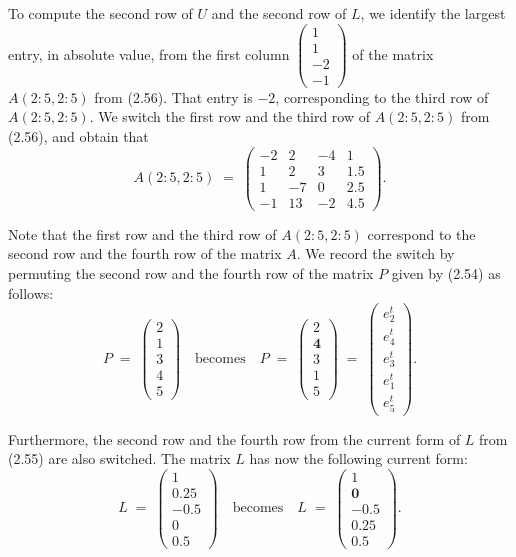 To compute the second row of $U$ and the second row of $L$, we identify the
largest entry, in absolute value, from the first column
$\begin{pmatrix} 1\\ 1\\ -2\\ -1 \end{pmatrix}$
of the matrix $A(2:5,2:5)$ from (2.56). That entry is $-2$, corresponding to
the third row of $A(2:5,2:5)$. We switch the first row and the third row of
$A(2:5,2:5)$ from (2.56), and obtain that
\begin{equation}
A(2:5,2:5) \;=\;
\begin{pmatrix} -2 & 2 & -4 & 1\\ 1 & 2 & 3 & 1.5\\ 1 & -7 & 0 & 2.5\\ -1 & 13 & -2 & 4.5 \end{pmatrix}.
\end{equation}

Note that the first row and the third row of $A(2:5,2:5)$ correspond to the
second row and the fourth row of the matrix $A$. We record the switch by
permuting the second row and the fourth row of the matrix $P$ given by
(2.54) as follows:
\begin{equation}
P \;=\; \begin{pmatrix} 2\\ 1\\ 3\\ 4\\ 5 \end{pmatrix}
\quad \text{becomes} \quad
P \;=\; \begin{pmatrix} 2\\ \mathbf{4}\\ 3\\ 1\\ 5 \end{pmatrix}
\;=\;
\begin{pmatrix} e_2^t\\ e_4^t\\ e_3^t\\ e_1^t\\ e_5^t \end{pmatrix}.
\end{equation}

Furthermore, the second row and the fourth row from the current form of $L$
from (2.55) are also switched. The matrix $L$ has now the following current
form:
\begin{equation}
L \;=\; \begin{pmatrix} 1\\ 0.25\\ -0.5\\ 0\\ 0.5 \end{pmatrix}
\quad \text{becomes} \quad
L \;=\; \begin{pmatrix} 1\\ \mathbf{0}\\ -0.5\\ \mathbf{0.25}\\ 0.5 \end{pmatrix}.
\end{equation}

